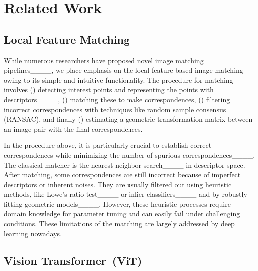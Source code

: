 \section{Related Work}
\label{sec:related}



\subsection{Local Feature Matching}


While numerous researchers have proposed novel image matching pipelines____, we place emphasis on the local feature-based image matching owing to its simple and intuitive functionality. The procedure for matching involves ({}) detecting interest points and representing the points with descriptors____, ({}) matching these to make correspondences, ({}) filtering incorrect correspondences with techniques like random sample consensus (RANSAC), and finally ({}) estimating a geometric transformation matrix between an image pair with the final correspondences. 

In the procedure above, it is particularly crucial to establish correct correspondences while minimizing the number of spurious correspondences____. The classical matcher is the nearest neighbor search____ in descriptor space. After matching, some correspondences are still incorrect because of imperfect descriptors or inherent noises. They are usually filtered out using heuristic methods, like Lowe's ratio test____ or inlier classifiers____ and by robustly fitting geometric models____. However, these heuristic processes require domain knowledge for parameter tuning and can easily fail under challenging conditions. These limitations of the matching are largely addressed by deep learning nowadays.

\subsection{Vision Transformer~(ViT)}

